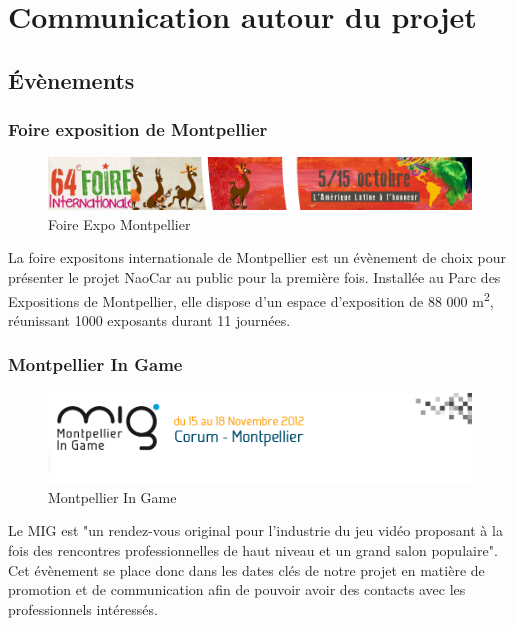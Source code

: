 \documentclass[11pt]{report} %
\begin{document}
	\section{Communication autour du projet}
		\subsection{Évènements}
			\subsubsection{Foire exposition de Montpellier}
				\begin{figure}[htb]
				\centering
				\includegraphics[width=1\textwidth]{foire-expo.png}
				\caption{Foire Expo Montpellier}
				\label{fig:Foire Expo Montpellier}
				\end{figure}
				La foire expositons internationale de Montpellier est un évènement de choix pour présenter le projet NaoCar au public pour la première fois. Installée au Parc des Expositions de Montpellier, elle dispose d'un espace d'exposition de 88 000 m\textsuperscript{2}, réunissant 1000 exposants durant 11 journées.
			\subsubsection{Montpellier In Game}
				\begin{figure}[htb]
				\centering
				\includegraphics[width=1\textwidth]{mig.png}
				\caption{Montpellier In Game}
				\label{fig:Montpellier In Game}
				\end{figure}
	                        Le MIG est "un rendez-vous original pour l’industrie du jeu vidéo proposant à la fois des rencontres professionnelles de haut niveau et un grand salon populaire". Cet évènement se place donc dans les dates clés de notre projet en matière de promotion et de communication afin de pouvoir avoir des contacts avec les professionnels intéressés.
\end{document}
